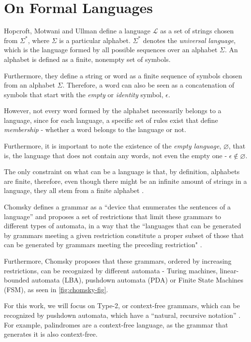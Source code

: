 \chapter{On Formal Languages}
Hopcroft, Motwani and Ullman define a language $\mathcal{L}$ as a set of strings chosen from $\Sigma^*$, where $\Sigma$ is a particular alphabet. $\Sigma^*$ denotes the \emph{universal language}, which is the language formed by all possible sequences over an alphabet $\Sigma$. An alphabet is defined as a finite, nonempty set of symbols. \cite{hopcroft-automata}

Furthermore, they define a string or word as a finite sequence of symbols chosen from an alphabet $\Sigma$. Therefore, a word can also be seen as a concatenation of symbols that start with the \emph{empty} or \emph{identity} symbol, $\epsilon$.

However, not every word formed by the alphabet necessarily belongs to a language, since for each language, a specific set of rules exist that define \emph{membership} - whether a word belongs to the language or not.

Furthermore, it is important to note the existence of the \emph{empty language}, $\varnothing$, that is, the language that does not contain any words, not even the empty one - $\epsilon \notin \varnothing$.

The only constraint on what can be a language is that, by definition, alphabets are finite, therefore, even though there might be an infinite amount of strings in a language, they all stem from a finite alphabet \cite{hopcroft-automata}.

Chomsky defines a grammar as a ``device that enumerates the sentences of a language'' and proposes a set of restrictions that limit these grammars to different types of automata, in a way that the ``languages that can be generated by grammars meeting a given restriction constitute a proper subset of those that can be generated by grammars meeting the preceding restriction" \cite{chomsky-hierarchy}. 

Furthermore, Chomsky proposes that these grammars, ordered by increasing restrictions, can be recognized by different automata - Turing machines, linear-bounded automata (LBA), pushdown automata (PDA) or Finite State Machines (FSM), as seen in \ref{fig:chomsky-fig}.

For this work, we will focus on Type-2, or context-free grammars, which can be recognized by pushdown automata, which have a ``natural, recursive notation'' \cite{hopcroft-automata}. For example, palindromes are a context-free language, as the grammar that generates it is also context-free.

